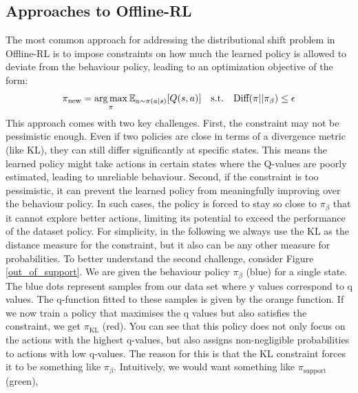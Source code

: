  \subsection{Approaches to Offline-RL}
The most common approach for addressing the distributional shift problem in Offline-RL is to impose constraints on how much 
the learned policy is allowed to deviate from the behaviour policy, leading to an optimization objective of the form:
$$\pi_\text{new} = \operatorname*{arg\,max}\limits_\pi \mathbb{E}_{a\sim \pi(a|s)}[Q(s,a)] \quad 
\text{s.t.} \quad \text{Diff}(\pi||\pi_\beta)\leq \epsilon$$ 
This approach comes with two key challenges. First, the constraint may not be pessimistic enough. Even if two policies are 
close in terms of a divergence metric (like KL), they can still differ significantly at specific states. This means the 
learned policy might take actions in certain states where the Q-values are poorly estimated, leading to unreliable 
behaviour.\newline 
Second, if the constraint is too pessimistic, it can prevent the learned policy from meaningfully improving over the behaviour 
policy. In such cases, the policy is forced to stay so close to $\pi_\beta$ that it cannot explore better actions, limiting 
its potential to exceed the performance of the dataset policy.\newline 
For simplicity, in the following we always use the KL as the distance measure for the 
constraint, but it also can be any other measure for probabilities.\newline
To better understand the second challenge, consider Figure \ref{out_of_support}.  We are given the behaviour policy $\pi_\beta$ (blue) for a single 
state. The blue dots represent samples from our data set where y values correspond to q values. The q-function fitted to 
these samples is given by the orange function. If we now train a policy that maximises the q values but also satisfies the 
constraint, we get $\pi_\text{KL}$ (red). You can see that this policy does not only focus on the actions with the highest 
q-values, but also assigns non-negligible probabilities to actions with low q-values. The reason for this is that the KL 
constraint forces it to be something like $\pi_\beta$. Intuitively, we would want something like $\pi_\text{support}$ (green),
